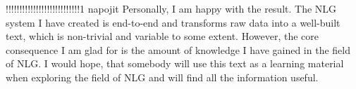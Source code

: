 !!!!!!!!!!!!!!!!!!!!!!!!!!!1 napojit
Personally, I am happy with the result. The NLG system I have created is end-to-end and transforms raw data into a well-built text, which is non-trivial and variable to some extent. However, the core consequence I am glad for is the amount of knowledge I have gained in the field of NLG. I would hope, that somebody will use this text as a learning material when exploring the field of NLG and will find all the information useful.
































